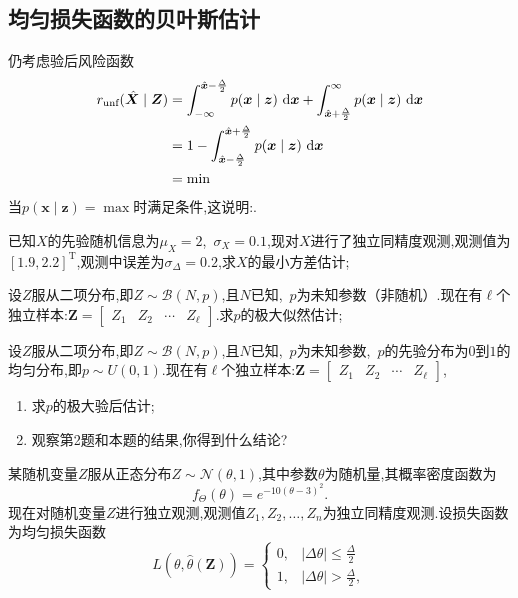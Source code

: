 \documentclass[cn,10pt,citestyle=gb7714-2015,bibstyle=gb7714-2015]{elegantbook}
\newcommand{\md}{\ \mathrm{d}}
\newcommand{\mT}{\mathrm{T}}
\renewcommand{\l}{\ell}
\begin{document}
\subsection{均匀损失函数的贝叶斯估计} 
仍考虑验后风险函数
\begin{align*}
  r_{\textup{unf}}(\hat{\bm{X}}\mid\bm{Z})&=\int_{-\infty}^{\hat{\bm{x}}-\frac{\Delta}{2}}p(\bm{x}\mid\bm{z})\md\bm{x}+\int_{\hat{\bm{x}}+\frac{\Delta}{2}}^\infty p(\bm{x}\mid\bm{z})\md\bm{x}\\
  &=1-\int_{\hat{\bm{x}}-\frac{\Delta}{2}}^{\hat{\bm{x}}+\frac{\Delta}{2}}p(\bm{x}\mid\bm{z})\md\bm{x}\\
  &=\min
\end{align*}
当$p(\bm{x}\mid\bm{z})=\max$时满足条件,这说明:.
\begin{problemset}
  \item 已知$X$的先验随机信息为$\mu_X=2$,\ $\sigma_X=0.1$,现对$X$进行了独立同精度观测,观测值为$[1.9,2.2]^\mT$,观测中误差为$\sigma_{\varDelta}=0.2$,求$X$的最小方差估计;
  \item 设$Z$服从二项分布,即$Z\sim\mathscr{B}(N,p)$,且$N$已知,\ $p$为未知参数（非随机）.现在有$\l$个独立样本:$\bm{Z}=\begin{bmatrix}
    Z_1&Z_2&\cdots&Z_\l
  \end{bmatrix}$.求$p$的极大似然估计;
  \item 设$Z$服从二项分布,即$Z\sim\mathscr{B}(N,p)$,且$N$已知,\ $p$为未知参数,\ $p$的先验分布为$0$到$1$的均匀分布,即$p\sim U(0,1)$.现在有$\l$个独立样本:$\bm{Z}=\begin{bmatrix}
    Z_1&Z_2&\cdots&Z_\l
  \end{bmatrix}$,
  \begin{enumerate}
    \item 求$p$的极大验后估计;
    \item 观察第2题和本题的结果,你得到什么结论?
  \end{enumerate}
  \item 某随机变量$Z$服从正态分布$Z\sim\mathcal{N}(\theta,1)$,其中参数$\theta$为随机量,其概率密度函数为
  \[
      f_{\Theta}(\theta)=e^{-10(\theta-3)^2}.  
  \]
  现在对随机变量$Z$进行独立观测,观测值$Z_1,Z_2,\ldots,Z_n$为独立同精度观测.设损失函数为均匀损失函数
  \[
      L(\theta,\hat{\theta}(\bm{Z}))=\begin{cases}
        0,&|\Delta\theta|\leqslant\frac{\Delta}{2}\\
        1,&|\Delta\theta|>\frac{\Delta}{2},
      \end{cases}
\]
\end{problemset}
\end{document}
